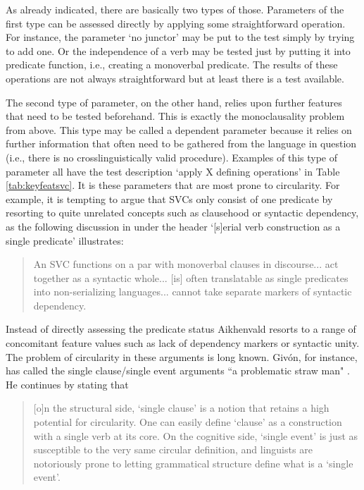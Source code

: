 As already indicated, there are basically two types of those. Parameters of the first type can be assessed directly by applying some straightforward operation. For instance, the parameter `no junctor' may be put to the test simply by trying to add one. Or the independence of a verb may be tested just by putting it into predicate function, i.e., creating a monoverbal predicate. The results of these operations are not always straightforward but at least there is a test available. 

The second type of parameter, on the other hand, relies upon further features that need to be tested beforehand. This is exactly the monoclausality problem from above. This type may be called a dependent parameter because it relies on further information that often need to be gathered from the language in question (i.e., there is no crosslinguistically valid procedure). Examples of this type of parameter all have the test description `apply X defining operations' in Table \ref{tab:keyfeatsvc}. It is these parameters that are most prone to circularity. For example, it is tempting to argue that SVCs only consist of one predicate by resorting to quite unrelated concepts such as clausehood or syntactic dependency, as the following discussion in \citet[4]{Aikhenvald2006} under the header `[s]erial verb construction as a single predicate' illustrates:
\begin{quote}An SVC functions on a par with monoverbal clauses in discourse... act together as a syntactic whole... [is] often translatable as single predicates into non-serializing languages... cannot take separate markers of syntactic dependency.\end{quote} 

Instead of directly assessing the predicate status Aikhenvald resorts to a range of concomitant feature values such as lack of dependency markers or syntactic unity. The problem of circularity in these arguments is long known. Givón, for instance, has called the single clause/single event arguments ``a problematic straw man" \citep[84]{givon1991serial}. He continues by stating that
\begin{quote}[o]n the structural side, `single clause' is a notion that retains a high potential for circularity. One can
easily define `clause' as a construction with a single verb at its core. On the cognitive side, `single event' is just as susceptible to the very same circular definition, and linguists are notoriously prone to letting grammatical structure define what is a `single event'.\end{quote}

